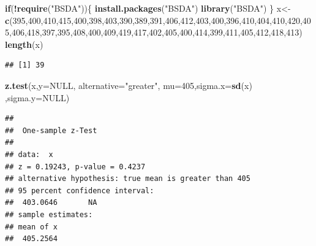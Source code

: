\documentclass[
]{article}
\newenvironment{Shaded}{\begin{snugshade}}{\end{snugshade}}
\newcommand{\AttributeTok}[1]{\textcolor[rgb]{0.13,0.29,0.53}{#1}}
\newcommand{\ConstantTok}[1]{\textcolor[rgb]{0.56,0.35,0.01}{#1}}
\newcommand{\ControlFlowTok}[1]{\textcolor[rgb]{0.13,0.29,0.53}{\textbf{#1}}}
\newcommand{\DecValTok}[1]{\textcolor[rgb]{0.00,0.00,0.81}{#1}}
\newcommand{\FunctionTok}[1]{\textcolor[rgb]{0.13,0.29,0.53}{\textbf{#1}}}
\newcommand{\NormalTok}[1]{#1}
\newcommand{\OtherTok}[1]{\textcolor[rgb]{0.56,0.35,0.01}{#1}}
\newcommand{\SpecialCharTok}[1]{\textcolor[rgb]{0.81,0.36,0.00}{\textbf{#1}}}
\newcommand{\StringTok}[1]{\textcolor[rgb]{0.31,0.60,0.02}{#1}}
\begin{document}
\begin{Shaded}
\begin{Highlighting}[]
\ControlFlowTok{if}\NormalTok{(}\SpecialCharTok{!}\FunctionTok{require}\NormalTok{(}\StringTok{"BSDA"}\NormalTok{))\{}
\FunctionTok{install.packages}\NormalTok{(}\StringTok{"BSDA"}\NormalTok{)}
\FunctionTok{library}\NormalTok{(}\StringTok{"BSDA"}\NormalTok{)}
\NormalTok{\}}
\NormalTok{x}\OtherTok{\textless{}{-}}\FunctionTok{c}\NormalTok{(}\DecValTok{395}\NormalTok{,}\DecValTok{400}\NormalTok{,}\DecValTok{410}\NormalTok{,}\DecValTok{415}\NormalTok{,}\DecValTok{400}\NormalTok{,}\DecValTok{398}\NormalTok{,}\DecValTok{403}\NormalTok{,}\DecValTok{390}\NormalTok{,}\DecValTok{389}\NormalTok{,}\DecValTok{391}\NormalTok{,}\DecValTok{406}\NormalTok{,}\DecValTok{412}\NormalTok{,}\DecValTok{403}\NormalTok{,}\DecValTok{400}\NormalTok{,}\DecValTok{396}\NormalTok{,}\DecValTok{410}\NormalTok{,}\DecValTok{404}\NormalTok{,}\DecValTok{410}\NormalTok{,}\DecValTok{420}\NormalTok{,}\DecValTok{405}\NormalTok{,}\DecValTok{406}\NormalTok{,}\DecValTok{418}\NormalTok{,}\DecValTok{397}\NormalTok{,}\DecValTok{395}\NormalTok{,}\DecValTok{408}\NormalTok{,}\DecValTok{400}\NormalTok{,}\DecValTok{409}\NormalTok{,}\DecValTok{419}\NormalTok{,}\DecValTok{417}\NormalTok{,}\DecValTok{402}\NormalTok{,}\DecValTok{405}\NormalTok{,}\DecValTok{400}\NormalTok{,}\DecValTok{414}\NormalTok{,}\DecValTok{399}\NormalTok{,}\DecValTok{411}\NormalTok{,}\DecValTok{405}\NormalTok{,}\DecValTok{412}\NormalTok{,}\DecValTok{418}\NormalTok{,}\DecValTok{413}\NormalTok{)}
\FunctionTok{length}\NormalTok{(x)}
\end{Highlighting}
\end{Shaded}

\begin{verbatim}
## [1] 39
\end{verbatim}

\begin{Shaded}
\begin{Highlighting}[]
\FunctionTok{z.test}\NormalTok{(x,}\AttributeTok{y=}\ConstantTok{NULL}\NormalTok{, }\AttributeTok{alternative=}\StringTok{"greater"}\NormalTok{, }\AttributeTok{mu=}\DecValTok{405}\NormalTok{,}\AttributeTok{sigma.x=}\FunctionTok{sd}\NormalTok{(x) ,}\AttributeTok{sigma.y=}\ConstantTok{NULL}\NormalTok{)}
\end{Highlighting}
\end{Shaded}

\begin{verbatim}
## 
##  One-sample z-Test
## 
## data:  x
## z = 0.19243, p-value = 0.4237
## alternative hypothesis: true mean is greater than 405
## 95 percent confidence interval:
##  403.0646       NA
## sample estimates:
## mean of x 
##  405.2564
\end{verbatim}
\end{document}
